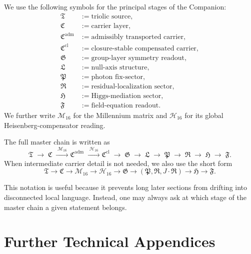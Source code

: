 \begin{definition}
We use the following symbols for the principal stages of the Companion:
\begin{align*}
\mathfrak T &:= \text{triolic source},\\
\mathfrak C &:= \text{carrier layer},\\
\mathfrak C^{\mathrm{adm}} &:= \text{admissibly transported carrier},\\
\mathfrak C^{\mathrm{cl}} &:= \text{closure-stable compensated carrier},\\
\mathfrak G &:= \text{group-layer symmetry readout},\\
\mathfrak L &:= \text{null-axis structure},\\
\mathfrak P &:= \text{photon fix-sector},\\
\mathfrak R &:= \text{residual-localization sector},\\
\mathfrak H &:= \text{Higgs-mediation sector},\\
\mathfrak F &:= \text{field-equation readout}.
\end{align*}
We further write $\mathcal M_{16}$ for the Millennium matrix and
$\mathcal H_{16}$ for its global Heisenberg-compensator reading.
\end{definition}

\begin{definition}
The full master chain is written as
\[
\mathfrak T
\;\longrightarrow\;
\mathfrak C
\;\xrightarrow{\;\mathcal M_{16}\;}
\mathfrak C^{\mathrm{adm}}
\;\xrightarrow{\;\mathcal H_{16}\;}
\mathfrak C^{\mathrm{cl}}
\;\longrightarrow\;
\mathfrak G
\;\longrightarrow\;
\mathfrak L
\;\longrightarrow\;
\mathfrak P
\;\longrightarrow\;
\mathfrak R
\;\longrightarrow\;
\mathfrak H
\;\longrightarrow\;
\mathfrak F.
\]
When intermediate carrier detail is not needed, we also use the short form
\[
\mathfrak T
\to
\mathfrak C
\to
\mathcal M_{16}
\to
\mathcal H_{16}
\to
\mathfrak G
\to
(\mathfrak P,\mathfrak R,J\!\cdot\!\mathfrak R)
\to
\mathfrak H
\to
\mathfrak F.
\]
\end{definition}

\begin{remark}
This notation is useful because it prevents long later sections from drifting
into disconnected local language. Instead, one may always ask at which stage
of the master chain a given statement belongs.
\end{remark}

\section{Further Technical Appendices}
\label{app:further-technical}




